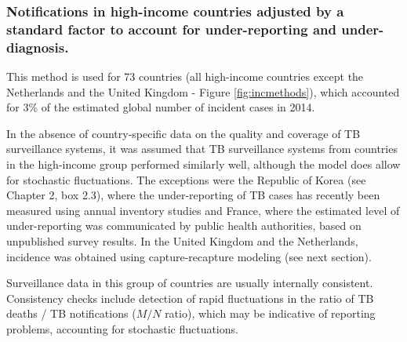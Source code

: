 \subsubsection {Notifications in high-income countries adjusted by a standard factor to account for under-reporting and under-diagnosis.} This method is used for 73 countries (all high-income countries except the Netherlands and the United Kingdom - Figure \ref{fig:incmethods}), which accounted for 3\% of the estimated global number of incident cases in 2014.

In the absence of country-specific data on the quality and coverage of TB surveillance systems, it was assumed that TB surveillance systems from countries in the high-income group performed similarly well, although the model does allow for stochastic fluctuations. The exceptions were the Republic of Korea (see Chapter 2, box 2.3), where the under-reporting of TB cases has recently been measured using annual inventory studies and France, where the estimated level of under-reporting was communicated by public health authorities, based on unpublished survey results. In the United Kingdom and the Netherlands, incidence was obtained using capture-recapture modeling (see next section).

Surveillance data in this group of countries are usually internally consistent. Consistency checks include detection of rapid fluctuations in the ratio of TB deaths / TB notifications ($M/N$ ratio), which may be indicative of reporting problems, accounting for stochastic fluctuations.



